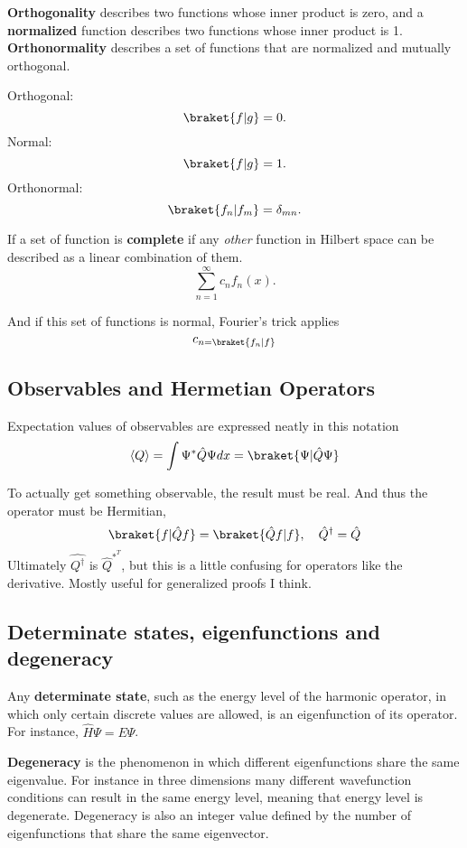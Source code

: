 \textbf{Orthogonality} describes two functions whose inner product is zero, and a \textbf{normalized} function describes two functions whose inner product is 1. \textbf{Orthonormality} describes a set of functions that are normalized and mutually orthogonal.

Orthogonal: \[\braket{f|g}=0.\] 
Normal: \[\braket{f|g}=1.\] 
Orthonormal: \[\braket{f_{n}|f_{m}}=\delta_{mn}.\] 

If a set of function is \textbf{complete} if any \textit{other} function in Hilbert space can be described as a linear combination of them.
\[\sum_{n=1}^{\infty}c_{n}f_{n}(x).\] 

And if this set of functions is normal, Fourier's trick applies
\begin{equation}
  c_{n=\braket{f_{n}|f}}
\end{equation}

\subsection{Observables and Hermetian Operators}

Expectation values of observables are expressed neatly in this notation
\begin{equation}
  \langle Q\rangle=\int\Psi^{*}\hat{Q}\Psi dx= \braket{\Psi|\hat{Q}\Psi}
\end{equation}

To actually get something observable, the result must be real. And thus the operator must be Hermitian,
\begin{equation}
  \braket{f|\hat{Q}f}=\braket{\hat{Q}f|f},\quad \hat{Q}^{\dag}=\hat{Q}
\end{equation}
Ultimately $ \hat{Q^{\dag}} $ is $ \hat{Q}^{*}^{T} $, but this is a little confusing for operators like the derivative. Mostly useful for generalized proofs I think.

\subsection{Determinate states, eigenfunctions and degeneracy}

Any \textbf{determinate state}, such as the energy level of the harmonic operator, in which only certain discrete values are allowed, is an eigenfunction of its operator. For instance, $ \hat{H}\Psi=E\Psi $.

\textbf{Degeneracy} is the phenomenon in which different eigenfunctions share the same eigenvalue. For instance in three dimensions many different wavefunction conditions can result in the same energy level, meaning that energy level is degenerate. Degeneracy is also an integer value defined by the number of eigenfunctions that share the same eigenvector.

